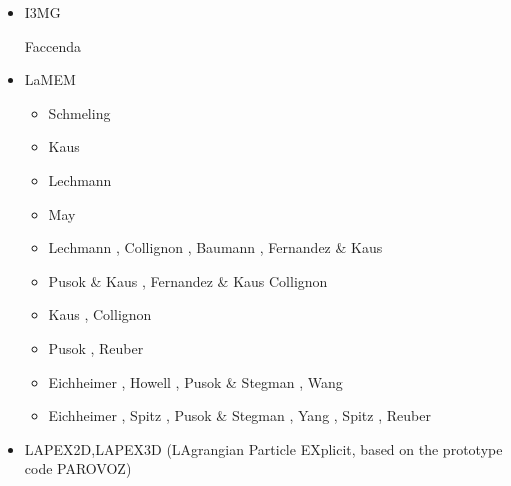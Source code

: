 \begin{itemize}
\item I3MG


\begin{scriptsize}
\twothousandfourteen Faccenda \cite{facc14}
\end{scriptsize}


\item LaMEM 

\begin{scriptsize}
\begin{itemize}
\item[\twothousandeight] Schmeling \etal \cite{scbe08}
\item[\twothousandten] Kaus \etal \cite{kamm10}
\item[\twothousandeleven] Lechmann \etal \cite{lemk11}
\item[\twothousandtwelve] May \cite{may12}
\item[\twothousandfourteen] Lechmann \etal \cite{lesh14}, Collignon \etal \cite{cokm14}, 
                            Baumann \etal \cite{bakp14}, 
                            Fernandez \& Kaus \cite{feka14a,feka14b}
\item[\twothousandfifteen] Pusok \& Kaus \cite{puka15}, Fernandez \& Kaus \cite{feka15}
                           Collignon \etal \cite{cofk15}
\item[\twothousandsixteen] Kaus \etal \cite{kapb16}, Collignon \etal \cite{coyc16}
\item[\twothousandeighteen] Pusok \etal \cite{pukp18}, Reuber \etal \cite{rekp18,repk18}
\item[\twothousandnineteen] Eichheimer \etal \cite{eitp19}, Howell \etal \cite{hooi19}, 
                            Pusok \& Stegman \cite{pust19}, Wang \etal \cite{wakz19}
\item[\twothousandtwenty] Eichheimer \etal \cite{eitf20}, Spitz \etal \cite{spsk20}, 
                          Pusok \& Stegman \cite{pust20}, Yang \etal \cite{yakl20}, 
                          Spitz \etal \cite{spbe20}, Reuber \etal \cite{rehp20}
\end{itemize}
\end{scriptsize}

\item LAPEX2D,LAPEX3D  (LAgrangian Particle EXplicit, based on the prototype code PAROVOZ) 


\end{itemize}
